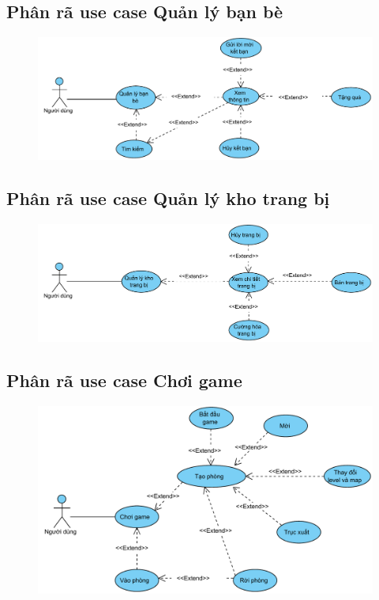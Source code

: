 \documentclass[3p]{elsarticle}
\begin{document}
\subsection{Phân rã use case Quản lý bạn bè}
\begin{figure}[!htbp]
	\hspace*{.5in}
	\centering
	\includegraphics[scale=.7]{images/usecases/gamer_FriendManagement.pdf}
\end{figure}
\newpage
\subsection{Phân rã use case Quản lý kho trang bị}
\begin{figure}[!htbp]
	\hspace*{-.5in}
	\centering
	\includegraphics[scale=.7]{images/usecases/gamer_ItemsManagement.pdf}
\end{figure}
\subsection{Phân rã use case Chơi game}
\begin{figure}[!htbp]
	\hspace*{.5in}
	\centering
	\includegraphics[scale=.7]{images/usecases/gamer_PlayGame.pdf}
\end{figure}
\newpage
\end{document}
